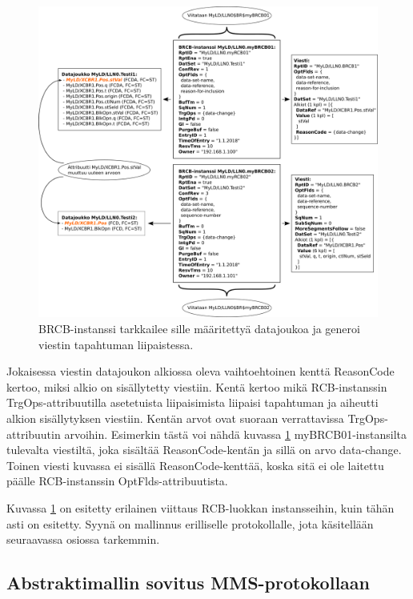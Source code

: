 \begin{figure}
	\includegraphics[width=1\textwidth]{pictures/iec61850-data-set-reporting.png}
	\caption{BRCB-instanssi tarkkailee sille määritettyä datajoukoa ja generoi viestin tapahtuman liipaistessa.}
	\label{fig:iec61850-data-set-reporting}
\end{figure}

Jokaisessa viestin datajoukon alkiossa oleva vaihtoehtoinen kenttä ReasonCode kertoo, miksi alkio on sisällytetty viestiin. Kentä kertoo mikä RCB-instanssin TrgOps-attribuutilla asetetuista liipaisimista liipaisi tapahtuman ja aiheutti alkion sisällytyksen viestiin. Kentän arvot ovat suoraan verrattavissa TrgOps-attribuutin arvoihin. Esimerkin tästä voi nähdä kuvassa \ref{fig:iec61850-data-set-reporting} myBRCB01-instansilta tulevalta viestiltä, joka sisältää ReasonCode-kentän ja sillä on arvo data-change. Toinen viesti kuvassa ei sisällä ReasonCode-kenttää, koska sitä ei ole laitettu päälle RCB-instanssin OptFlds-attribuutista.\cite[s.~28--29]{IEC61850-7-2}

Kuvassa \ref{fig:iec61850-data-set-reporting} on esitetty erilainen viittaus RCB-luokkan instansseihin, kuin tähän asti on esitetty. Syynä on mallinnus erilliselle protokollalle, jota käsitellään seuraavassa osiossa tarkemmin.


\subsection{Abstraktimallin sovitus MMS-protokollaan}


